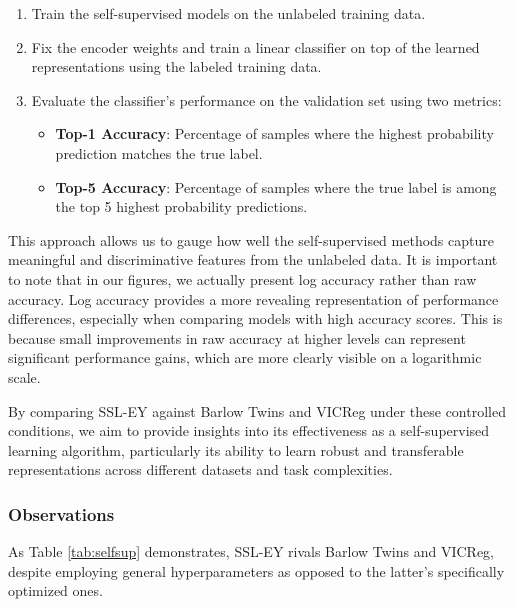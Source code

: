 \begin{enumerate}
    \item Train the self-supervised models on the unlabeled training data.
    \item Fix the encoder weights and train a linear classifier on top of the learned representations using the labeled training data.
    \item Evaluate the classifier's performance on the validation set using two metrics:
        \begin{itemize}
            \item \textbf{Top-1 Accuracy}: Percentage of samples where the highest probability prediction matches the true label.
            \item \textbf{Top-5 Accuracy}: Percentage of samples where the true label is among the top 5 highest probability predictions.
        \end{itemize}
\end{enumerate}

This approach allows us to gauge how well the self-supervised methods capture meaningful and discriminative features from the unlabeled data.
It is important to note that in our figures, we actually present log accuracy rather than raw accuracy. Log accuracy provides a more revealing representation of performance differences, especially when comparing models with high accuracy scores. This is because small improvements in raw accuracy at higher levels can represent significant performance gains, which are more clearly visible on a logarithmic scale.

By comparing SSL-EY against Barlow Twins and VICReg under these controlled conditions, we aim to provide insights into its effectiveness as a self-supervised learning algorithm, particularly its ability to learn robust and transferable representations across different datasets and task complexities.

\subsubsection{Observations} As Table \ref{tab:selfsup} demonstrates, SSL-EY rivals Barlow Twins and VICReg, despite employing general hyperparameters as opposed to the latter's specifically optimized ones.


